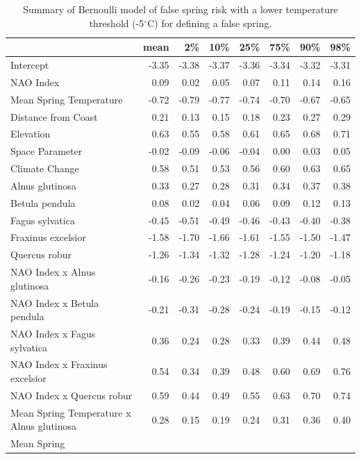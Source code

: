 \documentclass{article}\usepackage[]{graphicx}\usepackage[]{color}
\begin{document}
\begin{longtable}{lrrrrrrr}
\caption{Summary of Bernoulli model of false spring risk with a lower temperature threshold (-5$^{\circ}$C) for defining a false spring.} \\ 
  \hline
 & mean & 2\% & 10\% & 25\% & 75\% & 90\% & 98\% \\ 
  \hline \endhead  \hline
Intercept & -3.35 & -3.38 & -3.37 & -3.36 & -3.34 & -3.32 & -3.31 \\ 
  NAO Index & 0.09 & 0.02 & 0.05 & 0.07 & 0.11 & 0.14 & 0.16 \\ 
  Mean Spring 
Temperature & -0.72 & -0.79 & -0.77 & -0.74 & -0.70 & -0.67 & -0.65 \\ 
  Distance from 
Coast & 0.21 & 0.13 & 0.15 & 0.18 & 0.23 & 0.27 & 0.29 \\ 
  Elevation & 0.63 & 0.55 & 0.58 & 0.61 & 0.65 & 0.68 & 0.71 \\ 
  Space Parameter & -0.02 & -0.09 & -0.06 & -0.04 & 0.00 & 0.03 & 0.05 \\ 
  Climate Change & 0.58 & 0.51 & 0.53 & 0.56 & 0.60 & 0.63 & 0.65 \\ 
  Alnus glutinosa & 0.33 & 0.27 & 0.28 & 0.31 & 0.34 & 0.37 & 0.38 \\ 
  Betula pendula & 0.08 & 0.02 & 0.04 & 0.06 & 0.09 & 0.12 & 0.13 \\ 
  Fagus sylvatica & -0.45 & -0.51 & -0.49 & -0.46 & -0.43 & -0.40 & -0.38 \\ 
  Fraxinus excelsior & -1.58 & -1.70 & -1.66 & -1.61 & -1.55 & -1.50 & -1.47 \\ 
  Quercus robur & -1.26 & -1.34 & -1.32 & -1.28 & -1.24 & -1.20 & -1.18 \\ 
  NAO Index
x Alnus glutinosa & -0.16 & -0.26 & -0.23 & -0.19 & -0.12 & -0.08 & -0.05 \\ 
  NAO Index
x Betula pendula & -0.21 & -0.31 & -0.28 & -0.24 & -0.19 & -0.15 & -0.12 \\ 
  NAO Index
x Fagus sylvatica & 0.36 & 0.24 & 0.28 & 0.33 & 0.39 & 0.44 & 0.48 \\ 
  NAO Index
x Fraxinus excelsior & 0.54 & 0.34 & 0.39 & 0.48 & 0.60 & 0.69 & 0.76 \\ 
  NAO Index
x Quercus robur & 0.59 & 0.44 & 0.49 & 0.55 & 0.63 & 0.70 & 0.74 \\ 
  Mean Spring 
Temperature
x Alnus glutinosa & 0.28 & 0.15 & 0.19 & 0.24 & 0.31 & 0.36 & 0.40 \\ 
  Mean Spring 

\end{longtable}
\end{document}
